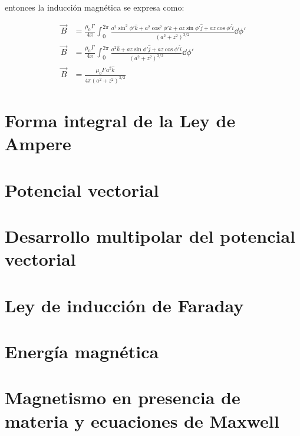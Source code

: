 \documentclass[11pt]{report}
\theoremstyle{plain}
\theoremstyle{definition}
\begin{document}
entonces la inducción magnética se expresa como:

\begin{align*}
	\vec{B} &= \frac{\mu_0I'}{4\pi}\int^{2\pi}_{0} \frac{a^2\sin^2{\phi'}\hat{k} + a^2\cos^2{\phi'}\hat{k} + az\sin{\phi'}\hat{j} + az\cos{\phi'}\hat{i}}{(a^2+z^2)^{3/2}}\dd{\phi'}\\
	\vec{B} &= \frac{\mu_0I'}{4\pi}\int^{2\pi}_{0} \frac{a^2\hat{k} + az\sin{\phi'}\hat{j} + az\cos{\phi'}\hat{i}}{(a^2+z^2)^{3/2}}\dd{\phi'}\\
	\vec{B} &= \frac{\mu_0I'a^2\hat{k}}{4\pi(a^2+z^2)^{3/2}}
\end{align*}

\chapter{Forma integral de la Ley de Ampere}


\chapter{Potencial vectorial}


\chapter{Desarrollo multipolar del potencial vectorial}


\chapter{Ley de inducción de Faraday}


\chapter{Energía magnética}


\chapter{Magnetismo en presencia de materia y ecuaciones de Maxwell}

\end{document}

